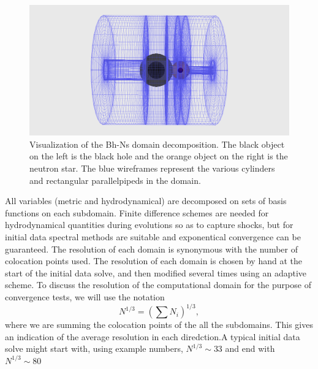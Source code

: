 \begin{center}
\begin{figure}[!ht]
\includegraphics[scale=0.45]{chap4/BhNsDomain.png}
\caption[Visualization of the Bh-Ns domain
decomposition.]{Visualization of the Bh-Ns domain decomposition. The
  black object on the left is the black hole and the orange object on
  the right is the neutron star. The blue wireframes represent the
  various cylinders and rectangular parallelpipeds in the domain.}
\label{fig:BhNsDomain}

\end{figure}
\end{center}

All variables (metric and hydrodynamical) are decomposed on sets of basis functions on each subdomain. Finite difference schemes are needed for hydrodynamical quantities during evolutions so as to capture shocks, but for initial data spectral methods are suitable and exponentical convergence can be guaranteed. The resolution of each domain is synonymous with the number of colocation points used. The resolution of each domain is chosen by hand at the start of the initial data solve, and then modified several times using an adaptive scheme. To discuss the resolution of the computational domain for the purpose of convergence tests, we will use the notation
\begin{equation}
N^{1/3}=\left(\sum N_i\right)^{1/3},
\end{equation}
where we are summing the colocation points of the all the
subdomains. This gives an indication of the average resolution in each
diredction.A typical initial data solve might start with, using example numbers, $N^{1/3}\sim 33$ and end with $N^{1/3}\sim 80$


